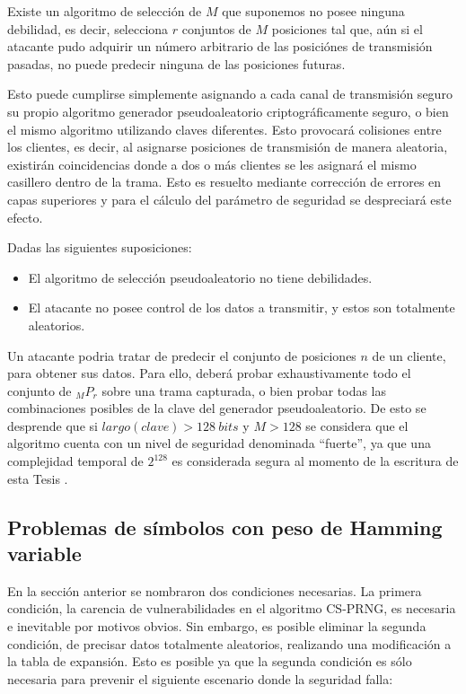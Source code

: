 Existe un algoritmo de selección de $M$ que suponemos no posee ninguna debilidad, es decir, selecciona $r$ conjuntos de $M$ posiciones tal que, aún si el atacante pudo adquirir un número arbitrario de las posiciónes de transmisión pasadas, no puede predecir ninguna de las posiciones futuras.

Esto puede cumplirse simplemente asignando a cada canal de transmisión seguro su propio algoritmo generador pseudoaleatorio criptográficamente seguro, o bien el mismo algoritmo utilizando claves diferentes. Esto provocará colisiones entre los clientes, es decir, al asignarse posiciones de transmisión de manera aleatoria, existirán coincidencias donde a dos o más clientes se les asignará el mismo casillero dentro de la trama. Esto es resuelto mediante corrección de errores en capas superiores y para el cálculo del parámetro de seguridad se despreciará este efecto.

Dadas las siguientes suposiciones:
\begin{itemize}
 \item El algoritmo de selección pseudoaleatorio no tiene debilidades.
 \item El atacante no posee control de los datos a transmitir, y estos son totalmente aleatorios.
\end{itemize}

Un atacante podria tratar de predecir el conjunto de posiciones $n$ de un cliente, para obtener sus datos. Para ello, deberá probar exhaustivamente todo el conjunto de $ _{M}P_{r}$ sobre una trama capturada, o bien probar todas las combinaciones posibles de la clave del generador pseudoaleatorio. De esto se desprende que si $largo(clave)>128\ bits$ y $M>128$ se considera que el algoritmo cuenta con un nivel de seguridad denominada ``fuerte'', ya que una complejidad temporal de $2^{128}$ es considerada segura al momento de la escritura de esta Tesis \cite{eastlake2005s}.

\subsection{Problemas de símbolos con peso de Hamming variable}
En la sección anterior se nombraron dos condiciones necesarias. La primera condición, la carencia de vulnerabilidades en el algoritmo CS-PRNG, es necesaria e inevitable por motivos obvios. Sin embargo, es posible eliminar la segunda condición, de precisar datos totalmente aleatorios, realizando una modificación a la tabla de expansión. Esto es posible ya que la segunda condición es sólo necesaria para prevenir el siguiente escenario donde la seguridad falla:

